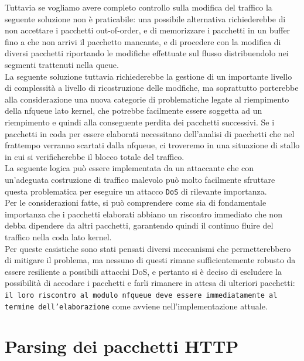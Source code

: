 Tuttavia se vogliamo avere completo controllo sulla modifica del traffico la seguente soluzione non è praticabile: una possibile alternativa richiederebbe
di non accettare i pacchetti out-of-order, e di memorizzare i pacchetti in un buffer fino a che non arrivi il pacchetto mancante, e di procedere con la modifica
di diversi pacchetti riportando le modifiche effettuate sul flusso distribuendolo nei segmenti trattenuti nella queue.\\
La seguente soluzione tuttavia richiederebbe la gestione di un importante livello di complessità a livello di ricostruzione delle modfiche, ma soprattutto
porterebbe alla considerazione una nuova categorie di problematiche legate al riempimento della nfqueue lato kernel, che potrebbe facilmente essere soggetta
ad un riempimento e quindi alla conseguente perdita dei pacchetti successivi. Se i pacchetti in coda per essere elaborati necessitano dell'analisi di pacchetti che nel
frattempo verranno scartati dalla nfqueue, ci troveremo in una situazione di stallo in cui si verificherebbe il blocco totale del traffico.\\
La seguente logica può essere implementata da un attaccante che con un'adeguata costruzione di traffico malevolo può molto facilmente
sfruttare questa problematica per eseguire un attacco \texttt{DoS} di rilevante importanza.\\
Per le considerazioni fatte, si può comprendere come sia di fondamentale importanza che i pacchetti elaborati abbiano un riscontro immediato che non
debba dipendere da altri pacchetti, garantendo quindi il continuo fluire del traffico nella coda lato kernel.\\

Per queste casistiche sono stati pensati diversi meccanismi che permetterebbero di mitigare il problema, ma nessuno di questi rimane
sufficientemente robusto da essere resiliente a possibili attacchi DoS, e pertanto si è deciso di escludere la possibilità
di accodare i pacchetti e farli rimanere in attesa di ulteriori pacchetti: \texttt{il loro riscontro al modulo nfqueue deve essere immediatamente al termine dell'elaborazione}
come avviene nell'implementazione attuale.\\

\section{Parsing dei pacchetti HTTP}

